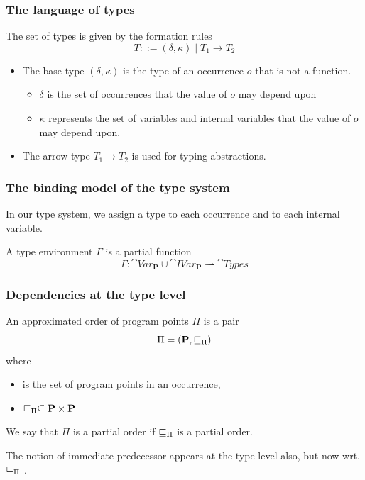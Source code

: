 \documentclass{beamer}
\begin{document}
 \begin{frame}
   \frametitle{The language of types}

   The set of types  is given by the formation rules
%
\[ T ::=(\delta,\kappa)\mid T_1 \rightarrow T_2 \]
%
\begin{itemize}
\item The base type $(\delta,\kappa)$ is the type of an occurrence $o$
  that is not a function.
  \begin{itemize}
  \item $\delta$ is the set of occurrences that the value of $o$ may depend
    upon
  \item $\kappa$ represents the set of variables and internal
    variables that the value of $o$ may depend upon.
  \end{itemize}
  
\item The arrow type $T_1 \rightarrow T_2$ is used for typing
  abstractions.
  \end{itemize}
\end{frame}

 
 
 \begin{frame}
   \frametitle{The binding model of the type system}

   In our type system, we assign a type to each occurrence and to each
   internal variable.

   A type environment $\Gamma$ is a partial function
   \[
     \Gamma:\cat{Var}_{\mathbf{P}}\cup\cat{IVar}_{\mathbf{P}}\rightharpoonup\cat{Types} \]
   
 \end{frame}

 \begin{frame}
   \frametitle{Dependencies at the type level}

	An approximated order of program points $\Pi$ is a pair
	\[ \Pi=(\textbf{P},\sqsubseteq_\Pi) \]
	where
	\begin{itemize}
		\item {} is the set of program points in an occurrence,
		\item $\sqsubseteq_\Pi\subseteq\textbf{P}\times\textbf{P}$
	\end{itemize}
	We say that $\Pi$ is a partial order if $\sqsubseteq_\Pi$ is a partial order.

        The notion of immediate predecessor appears at the type level also,
        but now wrt. $\sqsubseteq_\Pi$ .
        
      \end{frame}
\end{document}

